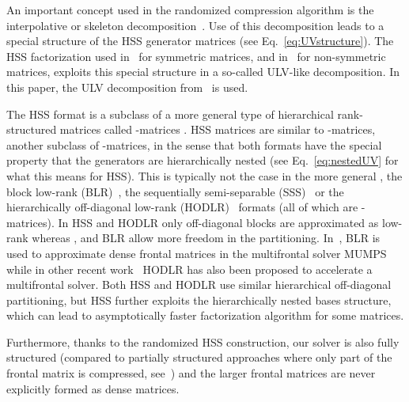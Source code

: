 \documentclass{article}
\newcommand{\ignore}[1]{}
\begin{document}
An important concept used in the randomized compression algorithm is
the interpolative or skeleton
decomposition~\cite{cheng2005compression}. Use of this decomposition
leads to a special structure of the HSS generator matrices (see
Eq.~\eqref{eq:UVstructure}). The HSS factorization used
in~\cite{xia2013randomized} for symmetric matrices, and
in~\cite{xia2012superfast} for non-symmetric matrices, exploits this
special structure in a so-called ULV-like decomposition. In this
paper, the ULV decomposition from~\cite{xia2012superfast} is used.

The HSS format is a subclass of a more general type of hierarchical
rank-structured matrices called -matrices
\cite{borm2003introduction}. HSS matrices are similar to
-matrices, another subclass of -matrices,
in the sense that both formats have the special property that the
generators are hierarchically nested (see Eq.~\eqref{eq:nestedUV} for
what this means for HSS). This is typically not the case in the more
general , the block low-rank
(BLR)~\cite{amestoy2014improving}, the sequentially semi-separable
(SSS)~\cite{vandebril2005bibliography} or the hierarchically
off-diagonal low-rank (HODLR)~\cite{SivaramPHD} formats (all of which
are -matrices). In HSS and HODLR only off-diagonal blocks
are approximated as low-rank whereas , 
and BLR allow more freedom in the
partitioning. In~\cite{amestoy2014improving}, BLR is used to
approximate dense frontal matrices in the multifrontal solver
MUMPS~\cite{amestoy2001fully} while in other recent
work~\cite{AminfarAD14} HODLR has also been proposed to accelerate a
multifrontal solver.  Both HSS and HODLR use similar hierarchical
off-diagonal partitioning, but HSS further exploits the hierarchically
nested bases structure, which can lead to asymptotically faster
factorization algorithm for some matrices.
\ignore{
\todo[inline]{[FH] The above sentence is true for some matrices and false
for some others. I think it is very dangerous to state things
like that or to try to justify why we do HSS and not something else.
So far no one has done any comparison besides a couple experiments
with BLR vs. HSS for 3D Helmholtz.}
}

Furthermore, thanks to the randomized HSS construction, our solver is
also fully structured (compared to partially structured approaches
where only part of the frontal matrix is compressed,
see~\cite{wang20113d}) and the larger frontal matrices are never
explicitly formed as dense matrices.
\end{document}

